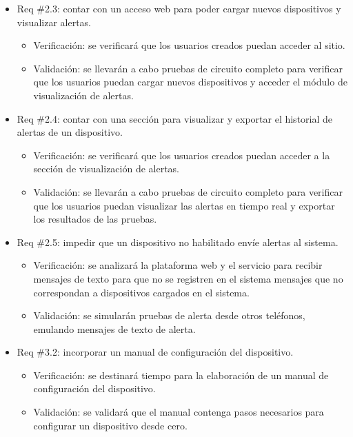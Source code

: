 \documentclass[
11pt, %
]{charter}
\begin{document}
\begin{itemize}
\item Req \#2.3: contar con un acceso web para poder cargar nuevos dispositivos y visualizar alertas.

\begin{itemize}
	\item Verificación: se verificará que los usuarios creados puedan acceder al sitio.
	\item Validación: se llevarán a cabo pruebas de circuito completo para verificar que los usuarios puedan cargar nuevos dispositivos y acceder el módulo de visualización de alertas.
\end{itemize}

\item Req \#2.4: contar con una sección para visualizar y exportar el historial de alertas de un dispositivo.

\begin{itemize}
	\item Verificación: se verificará que los usuarios creados puedan acceder a la sección de visualización de alertas.
	\item Validación: se llevarán a cabo pruebas de circuito completo para verificar que los usuarios puedan visualizar las alertas en tiempo real y exportar los resultados de las pruebas.
\end{itemize}

\item Req \#2.5: impedir que un dispositivo no habilitado envíe alertas al sistema.

\begin{itemize}
	\item Verificación: se analizará la plataforma web y el servicio para recibir mensajes de texto para que no se registren en el sistema mensajes que no correspondan a dispositivos cargados en el sistema. 
	\item Validación: se simularán pruebas de alerta desde otros teléfonos, emulando mensajes de texto de alerta.
\end{itemize}

\item Req \#3.2: incorporar un manual de configuración del dispositivo.

\begin{itemize}
	\item Verificación: se destinará tiempo para la elaboración de un manual de configuración del dispositivo. 
	\item Validación: se validará que el manual contenga pasos necesarios para configurar un dispositivo desde cero.
\end{itemize}

\end{itemize}
\end{document}
